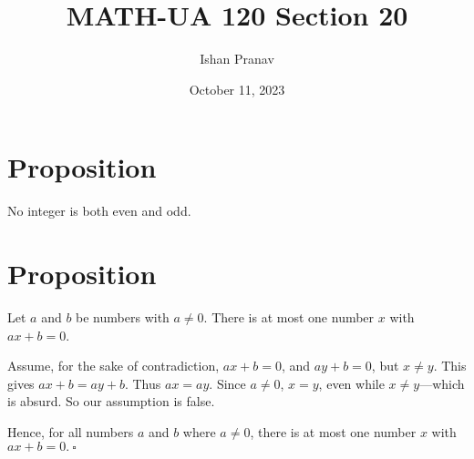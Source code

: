 \documentclass[12pt]{article}
\title{MATH-UA 120 Section 20}
\author{Ishan Pranav}
\date{October 11, 2023}
\begin{document}
\maketitle
\section*{Proposition}
No integer is both even and odd.
\section*{Proposition}
Let $a$ and $b$ be numbers with $a\neq 0$. There is at most one number $x$ with $ax+b=0$.

Assume, for the sake of contradiction, $ax+b=0$, and $ay+b=0$, but $x\neq y$. This gives $ax+b=ay+b$. Thus $ax=ay$. Since $a\neq 0$, $x=y$, even while $x\neq y$---which is absurd. So our assumption is false.

Hence, for all numbers $a$ and $b$ where $a\neq 0$, there is at most one number $x$ with $ax+b=0.~\square$
\end{document}
